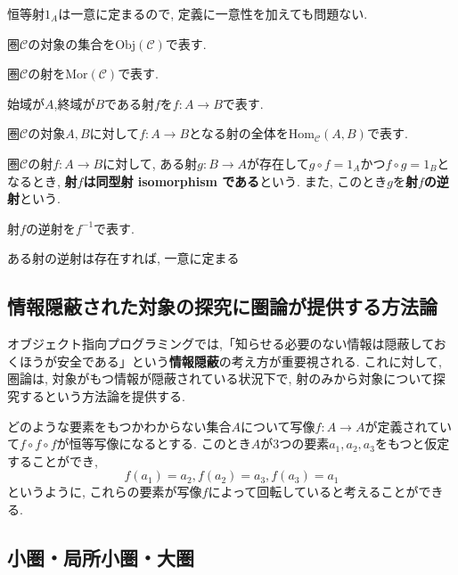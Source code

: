 \begin{caution}
恒等射$1_{A}$は一意に定まるので, 定義に一意性を加えても問題ない.
\end{caution}
\begin{Notation}
圏$\mathscr{C}$の対象の集合を$\mathrm{Obj}(\mathscr{C})$で表す.
\end{Notation}
\begin{Notation}
圏$\mathscr{C}$の射を$\mathrm{Mor}(\mathscr{C})$で表す.
\end{Notation}

\begin{Notation}
始域が$A$,終域が$B$である射$f$を$f:A\rightarrow B$で表す.
\end{Notation}
\begin{Notation}
圏$\mathscr{C}$の対象$A,B$に対して$f:A\rightarrow B$となる射の全体を$\mathrm{Hom}_{\mathscr{C}}(A,B)$で表す.
\end{Notation}
\begin{Def}
圏$\mathscr{C}$の射$f:A\rightarrow B$に対して,
ある射$g:B\rightarrow A$が存在して$g\circ f=1_A$かつ$f\circ g=1_B$となるとき,
{\bf 射$f$は同型射 isomorphism である}という. また, このとき$g$を{\bf 射$f$の逆射}という.
\end{Def}
\begin{Notation}
射$f$の逆射を$f^{-1}$で表す.
\end{Notation}
\begin{Prop}
ある射の逆射は存在すれば, 一意に定まる
\end{Prop}
\subsection{情報隠蔽された対象の探究に圏論が提供する方法論}
オブジェクト指向プログラミングでは,「知らせる必要のない情報は隠蔽しておくほうが安全である」という{\bf 情報隠蔽}の考え方が重要視される.
これに対して, 圏論は, 対象がもつ情報が隠蔽されている状況下で, 射のみから対象について探究するという方法論を提供する.
\begin{example}
どのような要素をもつかわからない集合$A$について写像$f:A\rightarrow A$が定義されていて$f\circ f\circ f$が恒等写像になるとする.
このとき$A$が3つの要素$a_1,a_2,a_3$をもつと仮定することができ,
\[
f(a_1)=a_2, f(a_2)=a_3, 
f(a_3)=a_1
\]
というように, これらの要素が写像$f$によって回転していると考えることができる.
\end{example}
\subsection{小圏・局所小圏・大圏}
